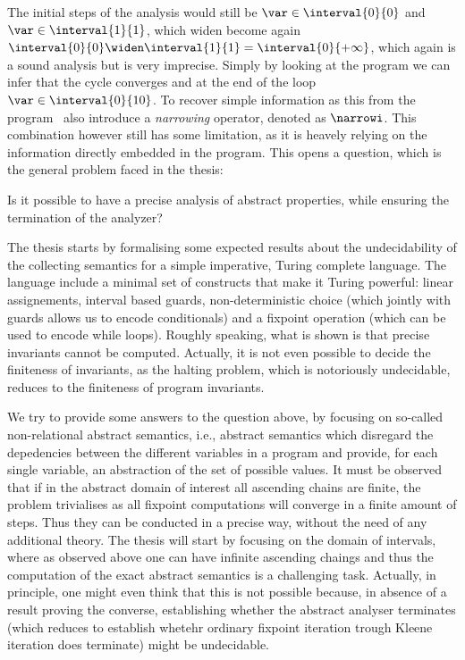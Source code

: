The initial steps of the analysis would still be
\(\var \in \interval{0}{0}\) and \(\var \in \interval{1}{1}\), which
widen become again
\(\interval{0}{0}\widen\interval{1}{1} = \interval{0}{+\infty}\),
which again is a sound analysis but is very imprecise. Simply by
looking at the program we can infer that the cycle converges and at
the end of the loop \(\var\in\interval{0}{10}\). To recover simple
information as this from the program~\cite{10.1007/3-540-55844-6_142}
also introduce a \emph{narrowing} operator, denoted as \(\narrowi\).
This combination however still has some limitation, as it is heavely
relying on the information directly embedded in the program.  This
opens a question, which is the general problem faced in the thesis:

\begin{problem*}
  Is it possible to have a precise analysis of abstract properties,
  while ensuring the termination of the analyzer?
\end{problem*}

The thesis starts by formalising some expected results about the
undecidability of the collecting semantics for a simple imperative,
Turing complete language. The language include a minimal set of
constructs that make it Turing powerful: linear assignements, interval
based guards, non-deterministic choice (which jointly with guards
allows us to encode conditionals) and a fixpoint operation (which can
be used to encode while loops). Roughly speaking, what is shown is
that precise invariants cannot be computed. Actually, it is not even
possible to decide the finiteness of invariants, as the halting
problem, which is notoriously undecidable, reduces to the finiteness
of program invariants.

We try to provide some answers to the question above, by focusing on
so-called non-relational abstract semantics, i.e., abstract semantics
which disregard the depedencies between the different variables in a
program and provide, for each single variable, an abstraction of the
set of possible values. It must be observed that if in the abstract
domain of interest all ascending chains are finite, the problem
trivialises as all fixpoint computations will converge in a finite
amount of steps. Thus they can be conducted in a precise way, without
the need of any additional theory. The thesis will start by focusing
on the domain of intervals, where as observed above one can have
infinite ascending chaings and thus the computation of the exact
abstract semantics is a challenging task. Actually, in principle, one
might even think that this is not possible because, in absence of a
result proving the converse, establishing whether the abstract
analyser terminates (which reduces to establish whetehr ordinary
fixpoint iteration trough Kleene iteration does terminate) might be
undecidable.

